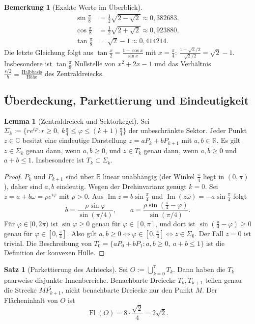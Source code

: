 \documentclass[a4paper,12pt,twoside]{report}
\theoremstyle{definition}
\newtheorem{satz}{Satz}
\newtheorem{lemma}{Lemma}
\newtheorem{bemerkung}{Bemerkung}
\begin{document}
\begin{bemerkung}[Exakte Werte im Überblick]
\begin{align*}
\sin\tfrac\pi8&=\tfrac12\sqrt{2-\sqrt2}\approx0{,}382683,\\
\cos\tfrac\pi8&=\tfrac12\sqrt{2+\sqrt2}\approx0{,}923880,\\
\tan\tfrac\pi8&=\sqrt2-1\approx0{,}414214 .
\end{align*}
Die letzte Gleichung folgt aus $\tan\frac x2=\frac{1-\cos x}{\sin x}$ mit $x=\frac\pi4$: $\frac{1-\sqrt2/2}{\sqrt2/2}=\sqrt2-1$. Insbesondere ist $\tan\frac\pi8$ Nullstelle von $x^2+2x-1$ und das Verhältnis $\frac{s/2}{h}=\frac{\text{Halbbasis}}{\text{Höhe}}$ des Zentraldreiecks.
\end{bemerkung}

\subsection{Überdeckung, Parkettierung und Eindeutigkeit}
\label{sec:ok:parkett}

\begin{lemma}[Zentraldreieck und Sektorkegel]\label{ok:lem:kegel}
Sei $\Sigma_k:=\{re^{i\varphi}:r\ge0,\ k\frac\pi4\le\varphi\le(k+1)\frac\pi4\}$ der unbeschränkte Sektor. Jeder Punkt $z\in\mathbb{C}$ besitzt eine eindeutige Darstellung $z=aP_k+bP_{k+1}$ mit $a,b\in\mathbb{R}$. Es gilt $z\in\Sigma_k$ genau dann, wenn $a,b\ge0$, und $z\in T_k$ genau dann, wenn $a,b\ge0$ und $a+b\le1$. Insbesondere ist $T_k\subset\Sigma_k$.
\end{lemma}

\begin{proof}
$P_k$ und $P_{k+1}$ sind über $\mathbb{R}$ linear unabhängig (der Winkel $\frac\pi4$ liegt in $(0,\pi)$), daher sind $a,b$ eindeutig. Wegen der Drehinvarianz genügt $k=0$. Sei $z=a+b\omega=\rho e^{i\varphi}$ mit $\rho>0$. Aus $\operatorname{Im}z=b\sin\frac\pi4$ und $\operatorname{Im}(z\bar\omega)=-a\sin\frac\pi4$ folgt
\[
b=\frac{\rho\sin\varphi}{\sin(\pi/4)},\qquad a=\frac{\rho\sin(\frac\pi4-\varphi)}{\sin(\pi/4)}.
\]
Für $\varphi\in[0,2\pi)$ ist $\sin\varphi\ge0$ genau für $\varphi\in[0,\pi]$, und dort ist $\sin(\frac\pi4-\varphi)\ge0$ genau für $\varphi\in[0,\frac\pi4]$. Also gilt $a,b\ge0\iff\varphi\in[0,\frac\pi4]\iff z\in\Sigma_0$. Der Fall $z=0$ ist trivial. Die Beschreibung von $T_0=\{aP_0+bP_1:a,b\ge0,\ a+b\le1\}$ ist die Definition der konvexen Hülle.
\end{proof}

\begin{satz}[Parkettierung des Achtecks]\label{ok:satz:parkett}
Sei $O:=\bigcup_{k=0}^7T_k$. Dann haben die $T_k$ paarweise disjunkte Innenbereiche. Benachbarte Dreiecke $T_k,T_{k+1}$ teilen genau die Strecke $\overline{MP_{k+1}}$, nicht benachbarte Dreiecke nur den Punkt $M$. Der Flächeninhalt von $O$ ist
\[
\operatorname{Fl}(O)=8\cdot\frac{\sqrt2}4=2\sqrt2 .
\]
\end{satz}
\end{document}
